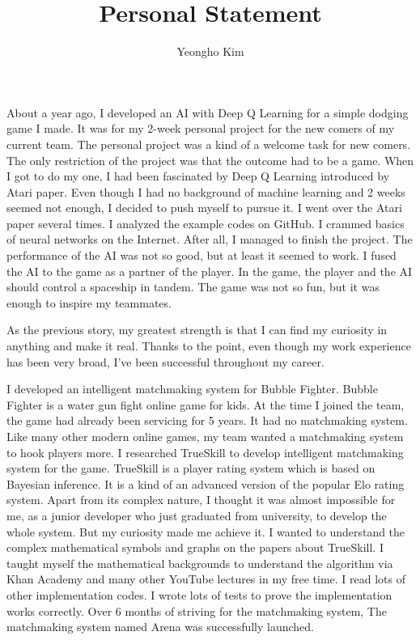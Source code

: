 \documentclass[11pt]{article}
\author{Yeongho Kim}
\date{}
\title{Personal Statement}
\begin{document}
\maketitle
\vspace{-6ex}

About a year ago, I developed an AI with Deep Q Learning for a simple dodging game I made.
It was for my 2-week personal project for the new comers of my current team.
The personal project was a kind of a welcome task for new comers.
The only restriction of the project was that the outcome had to be a game.
When I got to do my one, I had been fascinated by Deep Q Learning introduced by Atari paper.
Even though I had no background of machine learning and 2 weeks seemed not enough, I decided to push myself to pursue it.
I went over the Atari paper several times. I analyzed the example codes on GitHub. I crammed basics of neural networks on the Internet.
After all, I managed to finish the project. The performance of the AI was not so good, but at least it seemed to work.
I fused the AI to the game as a partner of the player.
In the game, the player and the AI should control a spaceship in tandem.
The game was not so fun, but it was enough to inspire my teammates. 

As the previous story, my greatest strength is that I can find my curiosity in anything and make it real.
Thanks to the point, even though my work experience has been very broad, I've been successful throughout my career. 

I developed an intelligent matchmaking system for Bubble Fighter.
Bubble Fighter is a water gun fight online game for kids.
At the time I joined the team, the game had already been servicing for 5 years.
It had no matchmaking system.
Like many other modern online games, my team wanted a matchmaking system to hook players more.
I researched TrueSkill to develop intelligent matchmaking system for the game.
TrueSkill is a player rating system which is based on Bayesian inference.
It is a kind of an advanced version of the popular Elo rating system.
Apart from its complex nature, I thought it was almost impossible for me, as a junior developer who just graduated from university, to develop the whole system.
But my curiosity made me achieve it.
I wanted to understand the complex mathematical symbols and graphs on the papers about TrueSkill.
I taught myself the mathematical backgrounds to understand the algorithm via Khan Academy and many other YouTube lectures in my free time.
I read lots of other implementation codes. I wrote lots of tests to prove the implementation works correctly.
Over 6 months of striving for the matchmaking system, The matchmaking system named Arena was successfully launched.
\end{document}
